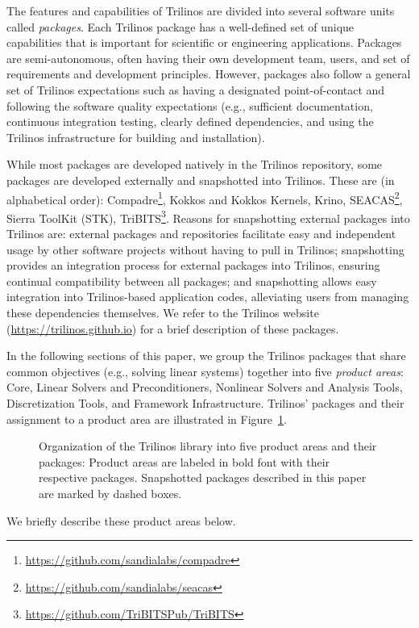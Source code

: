 
The features and capabilities of Trilinos are divided into several software units called \textit{packages}.
Each Trilinos package has a well-defined set of unique capabilities that is important for scientific or engineering applications. Packages are semi-autonomous, often having their own development team, users, and set of requirements and development principles.  However, packages also follow a general set of Trilinos expectations such as having a designated point-of-contact and following the software quality expectations (e.g., sufficient documentation, continuous integration testing, clearly defined dependencies, and using the Trilinos infrastructure for building and installation).

While most packages are developed natively in the Trilinos repository, some packages are developed externally and snapshotted into Trilinos.
These are (in alphabetical order):
Compadre\footnote{\url{https://github.com/sandialabs/compadre}},
Kokkos and Kokkos Kernels,
Krino,
SEACAS\footnote{\url{https://github.com/sandialabs/seacas}},
Sierra ToolKit (STK),
TriBITS\footnote{\url{https://github.com/TriBITSPub/TriBITS}}.
Reasons for snapshotting external packages into Trilinos are:
external packages and repositories facilitate easy and independent usage by other software projects without having to pull in Trilinos;
snapshotting provides an integration process for external packages into Trilinos, ensuring continual compatibility between all packages;
and snapshotting allows easy integration into Trilinos-based application codes, alleviating users from managing these dependencies themselves.
We refer to the Trilinos website (\url{https://trilinos.github.io}) for a brief description of these packages.

In the following sections of this paper, we group the Trilinos packages that share common objectives (e.g., solving linear systems) together into five \textit{product areas}:  Core, Linear Solvers and Preconditioners, Nonlinear Solvers and Analysis Tools, Discretization Tools, and Framework Infrastructure.
Trilinos' packages and their assignment to a product area are illustrated in Figure~\ref{fig:GraphicalOverview}.
\begin{figure}
\centering

\caption{Organization of the Trilinos library into five product areas and their packages: Product areas are labeled in bold font with their respective packages.
Snapshotted packages described in this paper are marked by dashed boxes.}
\label{fig:GraphicalOverview}
\end{figure}
We briefly describe these product areas below.

